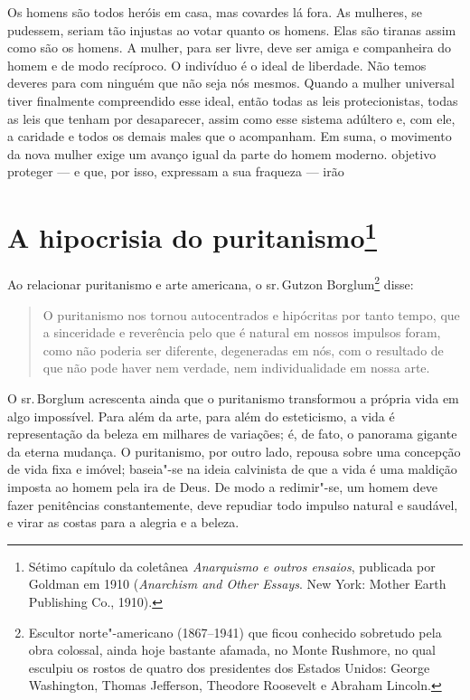 Os homens são todos heróis em casa, mas covardes lá fora. As mulheres,
se pudessem, seriam tão injustas ao votar quanto os homens. Elas são tiranas assim como são os homens. A mulher, para ser livre, deve ser amiga e companheira do homem e de modo
recíproco. O indivíduo é o ideal de liberdade. Não temos deveres para com ninguém que não seja nós mesmos.
Quando a mulher universal tiver finalmente compreendido esse ideal,
então todas as leis protecionistas, todas as leis que tenham por
desaparecer, assim como esse sistema adúltero e, com ele, a caridade e
todos os demais males que o acompanham. Em suma, o movimento da nova
mulher exige um avanço igual da parte do homem moderno.
objetivo proteger --- e que, por isso, expressam a sua fraqueza --- irão %

\chapter{A hipocrisia do puritanismo\footnote{Sétimo capítulo da coletânea
  \emph{Anarquismo e outros ensaios}, publicada por Goldman em 1910
  (\emph{Anarchism and Other Essays}. New York: Mother Earth Publishing
  Co., 1910).}}

Ao relacionar puritanismo e arte americana, o sr.\,Gutzon Borglum\footnote{Escultor norte"-americano (1867--1941) que ficou conhecido sobretudo pela obra colossal, ainda hoje bastante afamada, no Monte Rushmore, no qual esculpiu os rostos de quatro dos presidentes dos Estados Unidos: George Washington, Thomas Jefferson, Theodore Roosevelt e Abraham Lincoln.} disse:

\begin{quote}
O puritanismo nos tornou autocentrados e hipócritas por tanto tempo,
que a sinceridade e reverência pelo que é natural em nossos impulsos
foram, como não poderia ser diferente, degeneradas em nós, com o
resultado de que não pode haver nem verdade, nem individualidade em
nossa arte.
\end{quote}

O sr.\,Borglum acrescenta ainda que o puritanismo transformou a própria vida
em algo impossível. Para além da arte, para além do esteticismo, a vida
é representação da beleza em milhares de variações; é, de fato, o
panorama gigante da eterna mudança. O puritanismo, por outro lado,
repousa sobre uma concepção de vida fixa e imóvel; baseia"-se na ideia
calvinista de que a vida é uma maldição imposta ao homem pela ira de
Deus. De modo a redimir"-se, um homem deve fazer penitências
constantemente, deve repudiar todo impulso natural e saudável, e virar
as costas para a alegria e a beleza.

